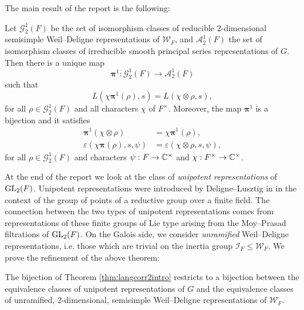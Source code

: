 The main result of the report is the following:
\begin{thm}[ = Theorem \ref{thm:langcorr2}, Langlands correspondence for principal series representations of $G$]\label{thm:langcorr2intro}
    Let $\mathcal{G}_2^1(F)$ be the set of isomorphism classes of reducible 2-dimensional semisimple Weil--Deligne representations of $\mathcal{W}_F$, and $\mathcal{A}_2^1(F)$ the set of isomorphism classes of irreducible smooth principal series representations of $G$. Then there is a unique map
$$\bm\pi^1:\mathcal{G}_2^1(F)\longrightarrow\mathcal{A}_2^1(F)$$
such that 
\begin{equation*}
	L(\chi\bm\pi^1(\rho),s)=L(\chi\otimes\rho,s),
\end{equation*}
for all $\rho\in\mathcal{G}_2^1(F)$ and all characters $\chi$ of $F^\times$. Moreover, the map $\bm\pi^1$ is a bijection and it satisfies
\begin{equation*}
	\begin{split}
		\bm\pi^1(\chi\otimes\rho)&=\chi\bm\pi^1(\rho),\\
		\varepsilon(\chi\bm\pi(\rho),s,\psi)&=\varepsilon(\chi\otimes\rho,s,\psi),
	\end{split}
\end{equation*}
for all $\rho\in\mathcal{G}_2^1(F)$ and characters $\psi:F \to \mathbb{C}^\times$ and $\chi: F^\times \to \mathbb{C}^\times$.
\end{thm}
At the end of the report we look at the class of \emph{unipotent representations} of $\mathrm{GL}_2(F)$. Unipotent representations were introduced by Deligne--Lusztig in \cite{DL1} in the context of the group of points of a reductive group over a finite field. The connection between the two types of unipotent representations comes from representations of these finite groups of Lie type arising from the Moy--Prasad filtrations of $\mathrm{GL}_2(F)$. On the Galois side, we consider \emph{unramified} Weil--Deligne representations, i.e. those which are trivial on the inertia group $\mathcal{I}_F\leq \mathcal{W}_F$. We prove the refinement of the above theorem:

\begin{thm}[= Corollary \ref{cor:unipotentcorr}, Langlands correspondence for unipotent representations of $G$]
    The bijection of Theorem \ref{thm:langcorr2intro} restricts to a bijection between the equivalence classes of unipotent representations of $G$ and the equivalence classes of unramified, 2-dimensional, semisimple Weil--Deligne representations of $\mathcal W_F$.    
\end{thm}

